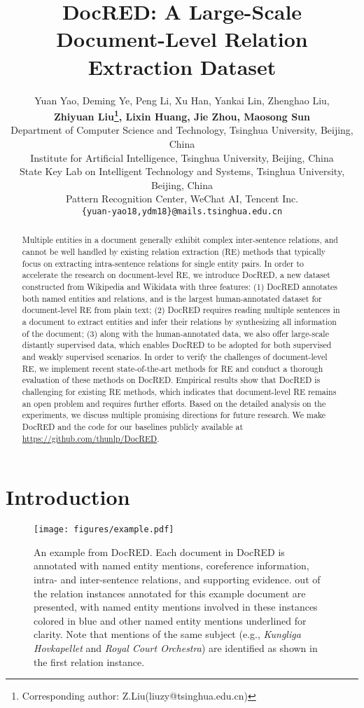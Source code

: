 \documentclass[11pt,a4paper]{article}
\title{DocRED: A Large-Scale Document-Level Relation Extraction Dataset}
\author{Yuan Yao\hspace{0.5em}, Deming Ye,  Peng Li, Xu Han, Yankai Lin, Zhenghao Liu, \\ \textbf{Zhiyuan Liu\thanks{\quad Corresponding author: Z.Liu(liuzy@tsinghua.edu.cn)}\hspace{0.5em}, Lixin Huang, Jie Zhou, Maosong Sun}\\
Department of Computer Science and Technology, Tsinghua University, Beijing, China\\
Institute for Artificial Intelligence, Tsinghua University, Beijing, China\\
State Key Lab on Intelligent Technology and Systems, Tsinghua University, Beijing, China \\
Pattern Recognition Center, WeChat AI, Tencent Inc.\\
\texttt{\{yuan-yao18,ydm18\}@mails.tsinghua.edu.cn}
}
\date{}
\begin{document}
\maketitle
\begin{abstract}
Multiple entities in a document generally exhibit complex inter-sentence relations, and cannot be well handled by existing relation extraction (RE) methods that typically focus on extracting intra-sentence relations for single entity pairs. In order to accelerate the research on document-level RE, we introduce DocRED, a new dataset constructed from Wikipedia and Wikidata with three features: (1) DocRED annotates both named entities and relations, and is the largest human-annotated dataset for document-level RE from plain text; (2) DocRED requires reading multiple sentences in a document to extract entities and infer their relations by synthesizing all information of the document; (3) along with the human-annotated data, we also offer large-scale distantly supervised data, which enables DocRED to be adopted for both supervised and weakly supervised scenarios. In order to verify the challenges of document-level RE, we implement recent state-of-the-art methods for RE and conduct a thorough evaluation of these methods on DocRED. Empirical results show that DocRED is challenging for existing RE methods, which indicates that document-level RE remains an open problem and requires further efforts. Based on the detailed analysis on the experiments, we discuss multiple promising directions for future research. We make DocRED and the code for our baselines publicly available at \url{https://github.com/thunlp/DocRED}.\end{abstract}


\section{Introduction}
\begin{figure}[t]
    \centering
    \texttt{[image: figures/example.pdf]}
    \caption{An example from DocRED. Each document in DocRED is annotated with named entity mentions, coreference information, intra- and inter-sentence relations, and supporting evidence.  out of the  relation instances annotated for this example document are presented, with  named entity mentions involved in these instances colored in blue and other named entity mentions underlined for clarity. Note that mentions of the same subject (e.g., \emph{Kungliga Hovkapellet} and \emph{Royal Court Orchestra}) are identified as shown in the first relation instance.}
    \label{fig:example}
    \vspace{-1.5em}
\end{figure}
\end{document}
